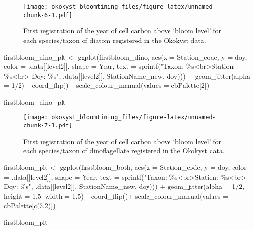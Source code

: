 \documentclass[
]{article}
\newenvironment{Shaded}{\begin{snugshade}}{\end{snugshade}}
\newcommand{\AttributeTok}[1]{\textcolor[rgb]{0.77,0.63,0.00}{#1}}
\newcommand{\DecValTok}[1]{\textcolor[rgb]{0.00,0.00,0.81}{#1}}
\newcommand{\FloatTok}[1]{\textcolor[rgb]{0.00,0.00,0.81}{#1}}
\newcommand{\FunctionTok}[1]{\textcolor[rgb]{0.00,0.00,0.00}{#1}}
\newcommand{\NormalTok}[1]{#1}
\newcommand{\OtherTok}[1]{\textcolor[rgb]{0.56,0.35,0.01}{#1}}
\newcommand{\SpecialCharTok}[1]{\textcolor[rgb]{0.00,0.00,0.00}{#1}}
\newcommand{\StringTok}[1]{\textcolor[rgb]{0.31,0.60,0.02}{#1}}
\begin{document}
\begin{figure}
\centering
\texttt{[image: okokyst\_bloomtiming\_files/figure-latex/unnamed-chunk-6-1.pdf]}
\caption{First registration of the year of cell carbon above `bloom
level' for each species/taxon of diatom registered in the Okokyst data.}
\end{figure}

\begin{Shaded}
\begin{Highlighting}[]
\NormalTok{firstbloom\_dino\_plt }\OtherTok{\textless{}{-}} \FunctionTok{ggplot}\NormalTok{(firstbloom\_dino, }\FunctionTok{aes}\NormalTok{(}\AttributeTok{x =}\NormalTok{ Station\_code, }\AttributeTok{y =}\NormalTok{ doy, }\AttributeTok{color =}\NormalTok{ .data[[level2]], }\AttributeTok{shape =}\NormalTok{ Year, }
                       \AttributeTok{text =} \FunctionTok{sprintf}\NormalTok{(}\StringTok{"Taxon: \%s\textless{}br\textgreater{}Station: \%s\textless{}br\textgreater{} Doy: \%s"}\NormalTok{, .data[[level2]], StationName\_new, doy))) }\SpecialCharTok{+}
  \FunctionTok{geom\_jitter}\NormalTok{(}\AttributeTok{alpha =} \DecValTok{1}\SpecialCharTok{/}\DecValTok{2}\NormalTok{)}\SpecialCharTok{+}
  \FunctionTok{coord\_flip}\NormalTok{()}\SpecialCharTok{+}
  \FunctionTok{scale\_colour\_manual}\NormalTok{(}\AttributeTok{values =}\NormalTok{ cbPalette[}\DecValTok{2}\NormalTok{])}

\NormalTok{firstbloom\_dino\_plt}
\end{Highlighting}
\end{Shaded}

\begin{figure}
\centering
\texttt{[image: okokyst\_bloomtiming\_files/figure-latex/unnamed-chunk-7-1.pdf]}
\caption{First registration of the year of cell carbon above `bloom
level' for each species/taxon of dinoflagellate registered in the
Okokyst data.}
\end{figure}

\begin{Shaded}
\begin{Highlighting}[]
\NormalTok{firstbloom\_plt }\OtherTok{\textless{}{-}} \FunctionTok{ggplot}\NormalTok{(firstbloom\_both, }\FunctionTok{aes}\NormalTok{(}\AttributeTok{x =}\NormalTok{ Station\_code, }\AttributeTok{y =}\NormalTok{ doy, }\AttributeTok{color =}\NormalTok{ .data[[level2]], }\AttributeTok{shape =}\NormalTok{ Year, }
                       \AttributeTok{text =} \FunctionTok{sprintf}\NormalTok{(}\StringTok{"Taxon: \%s\textless{}br\textgreater{}Station: \%s\textless{}br\textgreater{} Doy: \%s"}\NormalTok{, .data[[level2]], StationName\_new, doy))) }\SpecialCharTok{+}
  \FunctionTok{geom\_jitter}\NormalTok{(}\AttributeTok{alpha =} \DecValTok{1}\SpecialCharTok{/}\DecValTok{2}\NormalTok{, }\AttributeTok{height =} \FloatTok{1.5}\NormalTok{, }\AttributeTok{width =} \FloatTok{1.5}\NormalTok{)}\SpecialCharTok{+}
  \FunctionTok{coord\_flip}\NormalTok{()}\SpecialCharTok{+}
  \FunctionTok{scale\_colour\_manual}\NormalTok{(}\AttributeTok{values =}\NormalTok{ cbPalette[}\FunctionTok{c}\NormalTok{(}\DecValTok{3}\NormalTok{,}\DecValTok{2}\NormalTok{)])}

\NormalTok{firstbloom\_plt}
\end{Highlighting}
\end{Shaded}
\end{document}

